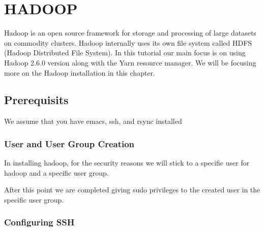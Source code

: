 \section{HADOOP}\label{hadoop}

Hadoop is an open source framework for storage and processing of large
datasets on commodity clusters. Hadoop internally uses its own file
system called HDFS (Hadoop Distributed File System). In this tutorial
our main focus is on using Hadoop 2.6.0 version along with the Yarn
resource manager. We will be focusing more on the Hadoop installation in
this chapter.

\subsection{Prerequisits}\label{prerequisits}

We assume that you have emacs, ssh, and rsync installed

\begin{Shaded}
\begin{Highlighting}[]
\NormalTok{$ } 
\NormalTok{$ } 
\NormalTok{$ } 
\end{Highlighting}
\end{Shaded}

\subsubsection{User and User Group
Creation}\label{user-and-user-group-creation}

In installing hadoop, for the security reasons we will stick to a
specific user for hadoop and a specific user group.

\begin{Shaded}
\begin{Highlighting}[]
\NormalTok{$ } 
\NormalTok{$ } 
\NormalTok{$ } 
\end{Highlighting}
\end{Shaded}

After this point we are completed giving sudo privileges to the created
user in the specific user group.

\subsubsection{Configuring SSH}\label{configuring-ssh}

